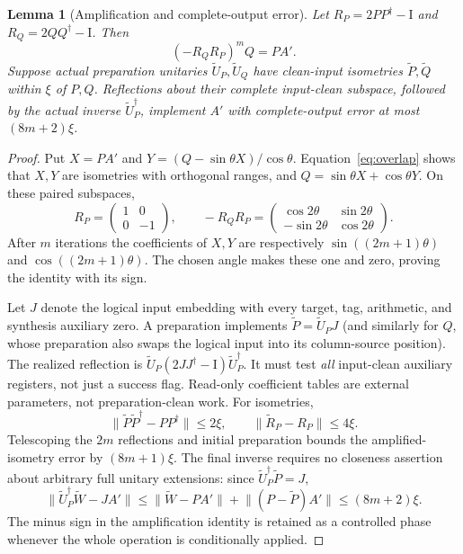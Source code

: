 \documentclass[11pt]{article}
\newtheorem{lemma}[theorem]{Lemma}
\theoremstyle{definition}
\newcommand{\norm}[1]{\lVert #1\rVert}
\newcommand{\Id}{\mathrm I}
\begin{document}
\begin{lemma}[Amplification and complete-output error]\label{lem:quantum}
Let $R_P=2PP^\dagger-\Id$ and $R_Q=2QQ^\dagger-\Id$. Then
\[
 (-R_QR_P)^m Q=PA'.
\]
Suppose actual preparation unitaries $\widetilde U_P,\widetilde U_Q$
have clean-input isometries $\widetilde P,\widetilde Q$ within $\xi$ of
$P,Q$. Reflections about their \emph{complete} input-clean subspace,
followed by the actual inverse $\widetilde U_P^\dagger$, implement $A'$
with complete-output error at most $(8m+2)\xi$.
\end{lemma}
\begin{proof}
Put $X=PA'$ and $Y=(Q-\sin\theta X)/\cos\theta$.
Equation~\eqref{eq:overlap} shows that $X,Y$ are isometries with orthogonal
ranges, and $Q=\sin\theta X+\cos\theta Y$. On these paired subspaces,
\[
 R_P=\begin{pmatrix}1&0\\0&-1\end{pmatrix},\qquad
 -R_QR_P=\begin{pmatrix}\cos2\theta&\sin2\theta\\
                              -\sin2\theta&\cos2\theta\end{pmatrix}.
\]
After $m$ iterations the coefficients of $X,Y$ are respectively
$\sin((2m+1)\theta)$ and $\cos((2m+1)\theta)$. The chosen angle makes
these one and zero, proving the identity with its sign.

Let $J$ denote the logical input embedding with every target, tag,
arithmetic, and synthesis auxiliary zero. A preparation implements
$\widetilde P=\widetilde U_PJ$ (and similarly for $Q$, whose preparation
also swaps the logical input into its column-source position).
The realized reflection is
$\widetilde U_P(2JJ^\dagger-\Id)\widetilde U_P^\dagger$.
It must test \emph{all} input-clean auxiliary registers, not just a
success flag. Read-only coefficient tables are external parameters, not
preparation-clean work. For isometries,
\[
 \norm{\widetilde P\widetilde P^\dagger-PP^\dagger}\le2\xi,
 \qquad\norm{\widetilde R_P-R_P}\le4\xi.
\]
Telescoping the $2m$ reflections and initial preparation bounds the
amplified-isometry error by $(8m+1)\xi$.
The final inverse requires no closeness assertion about arbitrary full
unitary extensions: since $\widetilde U_P^\dagger\widetilde P=J$,
\[
 \norm{\widetilde U_P^\dagger\widetilde W-JA'}
 \le\norm{\widetilde W-PA'}+
       \norm{(P-\widetilde P)A'}\le(8m+2)\xi.
\]
The minus sign in the amplification identity is retained as a controlled
phase whenever the whole operation is conditionally applied.
\end{proof}
\end{document}
